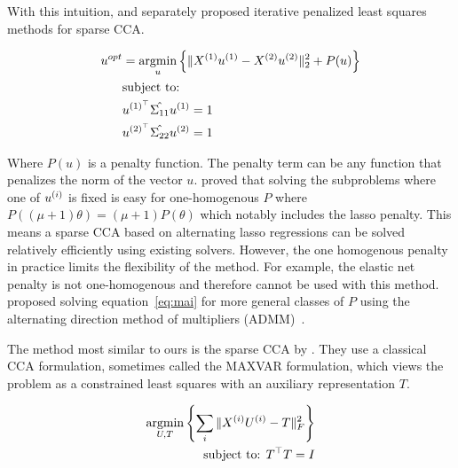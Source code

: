 With this intuition, \cite{wilms2015sparse} and \cite{mai2019iterative} separately proposed iterative penalized least
squares methods for sparse CCA\@.

\begin{align}
    \label{eq:mai}
    u^{opt} &= \underset{u}{\mathrm{argmin}} \left\{ \|X^{(1)}u^{(1)} - X^{(2)}u^{(2)}\|_2^2 + P(u) \right\} \\
    &\text{subject to:} \notag \\
    &u^{(1)^{\top}} \hat{\Sigma_{11}} u^{(1)}=1 \notag \\
    &u^{(2)^{\top}} \hat{\Sigma_{22}} u^{(2)}=1 \notag
\end{align}

Where \(P(u)\) is a penalty function.
The penalty term can be any function that penalizes the norm of the vector \(u\).
\citep{mai2019iterative} proved that solving the subproblems where one of $u^{(i)}$ is fixed is easy for one-homogenous $P$ where
\( P((\mu + 1)\theta) = (\mu + 1)P(\theta) \) which notably includes the lasso penalty.
This means a sparse CCA based
on alternating lasso regressions can be solved relatively efficiently using existing solvers.
However, the one homogenous penalty in practice limits the flexibility of the method.
For example, the elastic net penalty is not one-homogenous and therefore cannot be used with this method.\citep{
    kanatsoulis2018structured} proposed solving equation~\ref{eq:mai} for more general classes of $P$ using the
alternating direction method of multipliers (ADMM)~\citep{boyd2011distributed}.

The method most similar to ours is the sparse CCA by \cite{fu2017scalable}.
They use a classical CCA formulation, sometimes called the MAXVAR formulation, which views the problem as a constrained least squares with an auxiliary representation $T$\citep{carroll1968generalization,kettenring1971canonical}.


\begin{align}\label{eq:fu}
    \underset{U, T}{\mathrm{argmin}}\left\{\sum_i \|X^{(i)} U^{(i)} - T\|_F^2\right\}\\
    \text{subject to: }T^\top T = I\\
\end{align}

